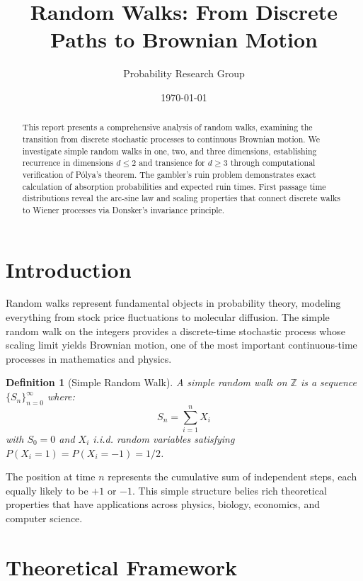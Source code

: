 \documentclass[a4paper, 11pt]{article}
\title{Random Walks: From Discrete Paths to Brownian Motion}
\author{Probability Research Group}
\date{\today}
\newtheorem{definition}{Definition}[section]
\begin{document}
\maketitle

\begin{abstract}
This report presents a comprehensive analysis of random walks, examining the transition from
discrete stochastic processes to continuous Brownian motion. We investigate simple random walks
in one, two, and three dimensions, establishing recurrence in dimensions $d \leq 2$ and transience
for $d \geq 3$ through computational verification of P\'olya's theorem. The gambler's ruin problem
demonstrates exact calculation of absorption probabilities and expected ruin times. First passage
time distributions reveal the arc-sine law and scaling properties that connect discrete walks to
Wiener processes via Donsker's invariance principle.
\end{abstract}

\section{Introduction}

Random walks represent fundamental objects in probability theory, modeling everything from stock
price fluctuations to molecular diffusion. The simple random walk on the integers provides a
discrete-time stochastic process whose scaling limit yields Brownian motion, one of the most
important continuous-time processes in mathematics and physics.

\begin{definition}[Simple Random Walk]
A simple random walk on $\mathbb{Z}$ is a sequence $\{S_n\}_{n=0}^{\infty}$ where:
\begin{equation}
S_n = \sum_{i=1}^{n} X_i
\end{equation}
with $S_0 = 0$ and $X_i$ i.i.d. random variables satisfying $P(X_i = 1) = P(X_i = -1) = 1/2$.
\end{definition}

The position at time $n$ represents the cumulative sum of independent steps, each equally likely
to be $+1$ or $-1$. This simple structure belies rich theoretical properties that have applications
across physics, biology, economics, and computer science.

\section{Theoretical Framework}
\end{document}
